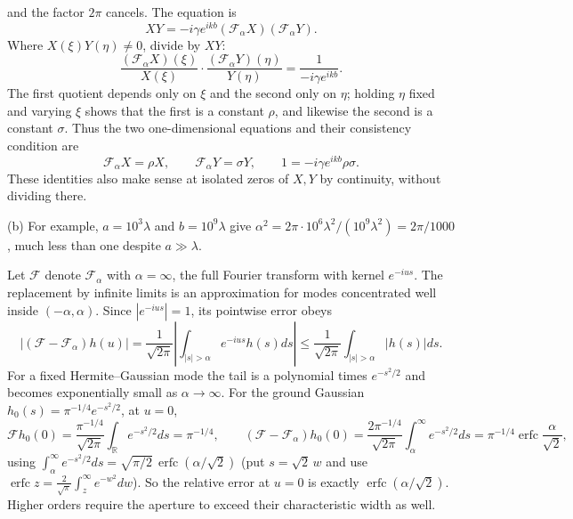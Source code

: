 and the factor $2\pi$ cancels. The equation is
\[
XY=-i\gamma e^{ikb}(\mathcal F_\alpha X)
(\mathcal F_\alpha Y).
\]
Where $X(\xi)Y(\eta)\ne0$, divide by $XY$:
\[
\frac{(\mathcal F_\alpha X)(\xi)}{X(\xi)}\cdot
\frac{(\mathcal F_\alpha Y)(\eta)}{Y(\eta)}
=\frac1{-i\gamma e^{ikb}}.
\]
The first quotient depends only on $\xi$ and the second only on $\eta$;
holding $\eta$ fixed and varying $\xi$ shows that the first is a
constant $\rho$, and likewise the second is a constant $\sigma$.
Thus the two one-dimensional equations and their consistency
condition are
\[
\boxed{\mathcal F_\alpha X=\rho X,\qquad
\mathcal F_\alpha Y=\sigma Y,\qquad
1=-i\gamma e^{ikb}\rho\sigma}.
\]
These identities also make sense at isolated zeros of $X,Y$ by
continuity, without dividing there.

(b) 
For example, $a=10^3\lambda$ and $b=10^9\lambda$ give
$\alpha^2=2\pi\cdot10^6\lambda^2/(10^9\lambda^2)=2\pi/1000$, much less
than one despite $a\gg\lambda$.

Let $\mathcal F$ denote $\mathcal F_\alpha$ with $\alpha=\infty$, the
full Fourier transform with kernel $e^{-ius}$. The replacement by
infinite limits is an approximation for modes
concentrated well inside $(-\alpha,\alpha)$. Since $|e^{-ius}|=1$, its
pointwise error obeys
\[
|(\mathcal F-\mathcal F_\alpha)h(u)|
=\frac1{\sqrt{2\pi}}\left|\int_{|s|>\alpha}e^{-ius}h(s)ds\right|
\le\frac1{\sqrt{2\pi}}\int_{|s|>\alpha}|h(s)|ds.
\]
For a fixed Hermite--Gaussian mode the tail is a polynomial times
$e^{-s^2/2}$ and becomes exponentially small as $\alpha\to\infty$.
For the ground Gaussian $h_0(s)=\pi^{-1/4}e^{-s^2/2}$, at $u=0$,
\[
\mathcal Fh_0(0)=\frac{\pi^{-1/4}}{\sqrt{2\pi}}
\int_{\mathbb R}e^{-s^2/2}ds=\pi^{-1/4},\qquad
(\mathcal F-\mathcal F_\alpha)h_0(0)
=\frac{2\pi^{-1/4}}{\sqrt{2\pi}}\int_\alpha^\infty e^{-s^2/2}ds
=\pi^{-1/4}\operatorname{erfc}\frac{\alpha}{\sqrt2},
\]
using $\int_\alpha^\infty e^{-s^2/2}ds=\sqrt{\pi/2}\,
\operatorname{erfc}(\alpha/\sqrt2)$ (put $s=\sqrt2\,w$ and use
$\operatorname{erfc}z=\frac2{\sqrt\pi}\int_z^\infty e^{-w^2}dw$). So the
relative error at $u=0$ is exactly
$\operatorname{erfc}(\alpha/\sqrt2)$. Higher orders require the aperture
to exceed their characteristic width as well.

